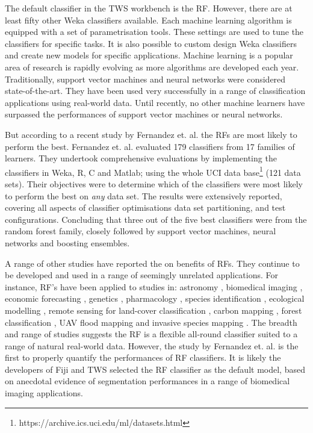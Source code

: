 The default classifier in the \ac{TWS} workbench is the \ac{RF}. However, there are at least fifty other \ac{Weka} classifiers available. Each machine learning algorithm is equipped with a set of parametrisation tools. These settings are used to tune the classifiers for specific tasks. It is also possible to custom design \ac{Weka} classifiers and create new models for specific applications. Machine learning is a popular area of research is rapidly evolving as more algorithms are developed each year. Traditionally, support vector machines and neural networks were considered state-of-the-art. They have been used very successfully in a range of classification applications using real-world data. Until recently, no other machine learners have surpassed the performances of support vector machines or neural networks.

But according to a recent study by Fernandez et. al. \cite{Fernandez2014} the \acp{RF} are most likely to perform the best. Fernandez et. al. \cite{Fernandez2014} evaluated 179 classifiers from 17 families of learners. They undertook comprehensive evaluations by implementing the classifiers in Weka, R, C and Matlab; using the whole UCI data base\footnote{https://archive.ics.uci.edu/ml/datasets.html} (121 data sets). Their objectives were to determine which of the classifiers were most likely to perform the best on \emph{any} data set. The results were extensively reported, covering all aspects of classifier optimisations data set partitioning, and test configurations. Concluding that three out of the five best classifiers were from the random forest family, closely followed by support vector machines, neural networks and boosting ensembles.

A range of other studies have reported the on benefits of \acp{RF}. They continue to be developed and used in a range of seemingly unrelated applications. For instance, \ac{RF}'s have been applied to studies in: astronomy \cite{Albert2008}, biomedical imaging \cite{Genuer2010}, economic forecasting \cite{Kumar2006}, genetics \cite{Diaz2006}, pharmacology \cite{Svetnik2004}, species identification \cite{Larios2010}, ecological modelling \cite{Prasad2006,Cutler2007,Schwartz2006}, remote sensing for land-cover classification \cite{Rodriguez2012}, carbon mapping \cite{Mascaro2014}, forest classification \cite{Mellor2013}, \ac{UAV} flood mapping \cite{Feng2015a,Feng2015b} and invasive species mapping \cite{Cutler2003,Lawrence2006}. The breadth and range of studies suggests the \ac{RF} is a flexible all-round classifier suited to a range of natural real-world data. However, the study by Fernandez et. al. \cite{Fernandez2014} is the first to properly quantify the performances of \ac{RF} classifiers. It is likely the developers of \ac{Fiji} and \ac{TWS} selected the \ac{RF} classifier as the default model, based on anecdotal evidence of segmentation performances in a range of biomedical imaging applications. 


